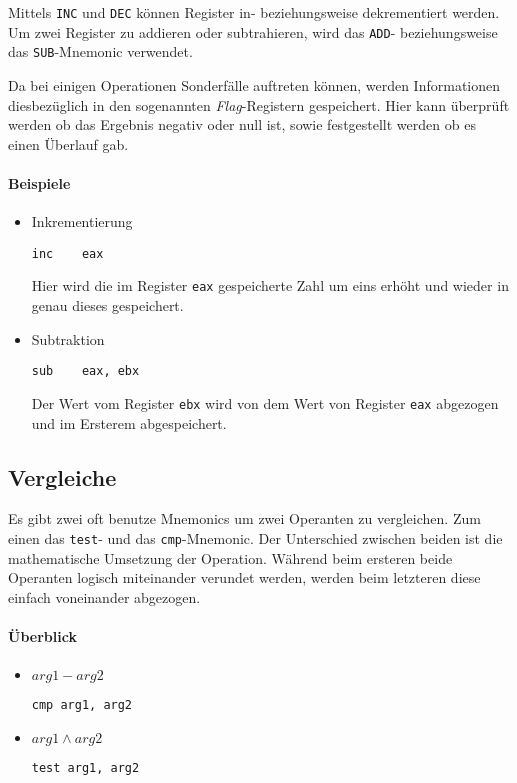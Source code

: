 Mittels \texttt{INC} und \texttt{DEC} können Register in- beziehungsweise dekrementiert werden. Um zwei Register zu addieren oder subtrahieren, wird das \texttt{ADD}- beziehungsweise das \texttt{SUB}-Mnemonic verwendet.

Da bei einigen Operationen Sonderfälle auftreten können, werden Informationen diesbezüglich in den sogenannten \textit{Flag}-Registern gespeichert.
Hier kann überprüft werden ob das Ergebnis negativ oder null ist, sowie festgestellt werden ob es einen Überlauf gab.

\paragraph{Beispiele}

\begin{itemize}
	\item Inkrementierung
		\begin{verbatim}inc    eax\end{verbatim}
		Hier wird die im Register \texttt{eax} gespeicherte Zahl um eins erhöht und wieder in genau dieses gespeichert.

	\item Subtraktion
		\begin{verbatim}sub    eax, ebx\end{verbatim}
		Der Wert vom Register \texttt{ebx} wird von dem Wert von Register \texttt{eax} abgezogen und im Ersterem abgespeichert.
\end{itemize}

\subsection{Vergleiche}
Es gibt zwei oft benutze Mnemonics um zwei Operanten zu vergleichen. Zum einen das \texttt{test}- und das \texttt{cmp}-Mnemonic.
Der Unterschied zwischen beiden ist die mathematische Umsetzung der Operation. Während beim ersteren beide Operanten logisch miteinander verundet werden, werden beim letzteren diese einfach voneinander abgezogen. 

\paragraph{Überblick}
\begin{itemize}
	\item $arg1 - arg2$
	\begin{verbatim}cmp arg1, arg2\end{verbatim}

	\item $arg1 \wedge arg2$
	\begin{verbatim}test arg1, arg2\end{verbatim}
\end{itemize}

